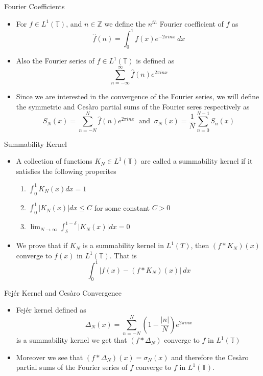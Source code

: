 \documentclass[compress]{beamer}
\newcommand{\Z}{\mathbb Z}
\newcommand{\T}{\mathbb T}
\begin{document}
\begin{frame}{Fourier Coefficients}
  \begin{itemize}
    \item For $f \in L^1(\T)$, and $n \in \Z$ we define the $n^{th}$ Fourier coefficient of $f$ as $$\hat{f}(n) = \int_0^1 f(x)e^{-2\pi i n x} \ dx $$
    \item Also the Fourier series of $f \in L^1(\T)$ is defined as $$\sum_{n=-\infty }^\infty \hat{f}(n) e^{2\pi in x} $$
    \item Since we are interested in the convergence of the Fourier series, we will define the symmetric and Ces\`aro partial sums of the Fourier seres respectively as $$ S_N(x) = \sum_{n=-N}^N \hat{f}(n)e^{2\pi inx} \ \text{ and } \  \sigma_N(x) = \frac{1}{N}\sum_{n=0}^{N-1} S_n(x)$$
   \end{itemize}
\end{frame}

\begin{frame}{Summability Kernel}
  \begin{itemize}
    \item A collection of functions $K_N \in L^1(\T)$ are called a summability kernel if it satisfies the following properites
      \begin{enumerate}
        \item $\int_{0}^{1}K_N(x)dx = 1$
        \item $\int_{0}^{1}\lvert K_N(x)\rvert dx \le C$ for some constant $C>0$
        \item $\lim_{N\to\infty} \int_{\delta}^{1-\delta}\lvert K_N(x)\rvert dx= 0$
      \end{enumerate}
    \item We prove that if $K_N$ is a summability kernel in $L^1(T)$, then $(f*K_N)(x)$ converge to $f(x)$ in $L^1(\T)$. That is $$\int_0^1 \lvert f(x) - (f*K_N)(x) \rvert \ dx$$
  \end{itemize}
\end{frame}

\begin{frame}{Fej\'er Kernel and Ces\`aro Convergence}
  \begin{itemize}
    \item Fej\'er kernel defined as $$\Delta_N(x) = \sum_{n=-N}^N\left(1 - \frac{|n|}{N} \right)e^{2\pi inx}$$
      is a summability kernel we get that $(f*\Delta_N)$ converge to $f$ in $L^1(\T)$
    \item Moreover we see that $(f*\Delta_N)(x) = \sigma_N(x)$ and therefore the Ces\`aro partial sums of the Fourier series of $f$ converge to $f$ in $L^1(\T)$.
  \end{itemize}
\end{frame}
\end{document}
